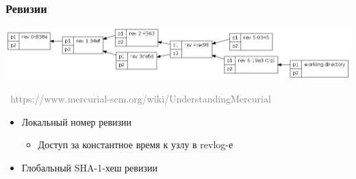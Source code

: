 \documentclass[xetex,mathserif,serif]{beamer}
\newcommand{\attribution}[1] {
    \vspace{-5mm}\begin{flushright}\begin{scriptsize}\textcolor{gray}{\textcopyright\, #1}\end{scriptsize}\end{flushright}
}
\begin{document}
    \begin{frame}
        \frametitle{Ревизии}
        \begin{center}
            \includegraphics[width=\textwidth]{mercurialRevisions.png}
            \attribution{https://www.mercurial-scm.org/wiki/UnderstandingMercurial}
        \end{center}
        \begin{itemize}
            \item Локальный номер ревизии
            \begin{itemize}
                \item Доступ за константное время к узлу в revlog-е
            \end{itemize}
            \item Глобальный SHA-1-хеш ревизии
        \end{itemize}
    \end{frame}
\end{document}
